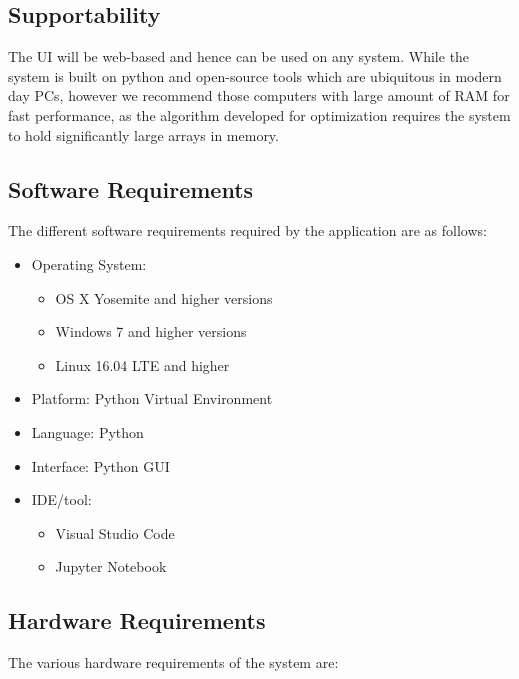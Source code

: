     \subsection{Supportability}
    The UI will be web-based and hence can be used on any system. While the system is built on python and open-source tools which are ubiquitous in modern day PCs, however we recommend those computers with large amount of RAM for fast performance, as the algorithm developed for optimization requires the system to hold significantly large arrays in memory.

    \subsection{Software Requirements}
    The different software requirements required by the application are as follows:
    \begin{itemize}
        \item Operating System:
        \begin{itemize}
            \item OS X Yosemite and higher versions
            \item Windows 7 and higher versions
            \item Linux 16.04 LTE and higher
        \end{itemize}
        \item Platform: Python Virtual Environment
        \item Language: Python
        \item Interface: Python GUI
        \item IDE/tool:
        \begin{itemize}
            \item Visual Studio Code
            \item Jupyter Notebook
        \end{itemize}
    \end{itemize}

    \subsection{Hardware Requirements}
    The various hardware requirements of the system are:

